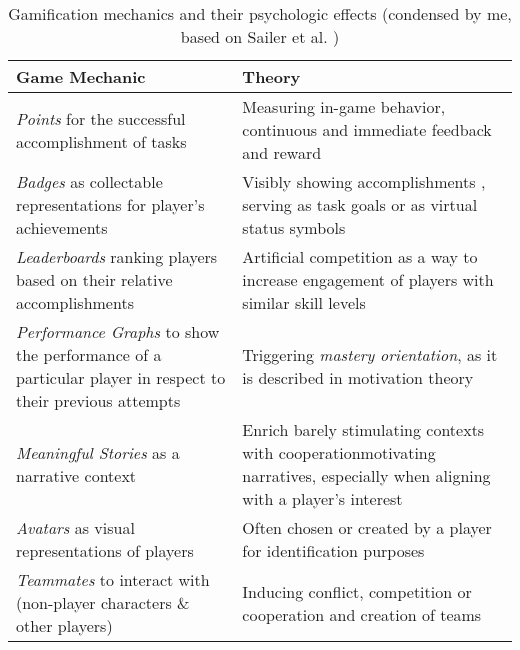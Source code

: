 \begin{table}[h]
  \begin{tabularx}{\textwidth}{| X | X |}
    \hline
    \textbf{Game Mechanic}                                                                                           & \textbf{Theory}                                                                                                                                        \\ \hline
    \textit{Points} for the successful accomplishment of tasks                                                       & Measuring in-game behavior, continuous and immediate feedback and reward \cite{sailer2014psychological}                                                \\ \hline
    \textit{Badges} as collectable representations for player's achievements                                         & Visibly showing accomplishments \cite{antin2011badges}, serving as task goals or as virtual status symbols \cite{werbach2012win}                       \\ \hline
    \textit{Leaderboards} ranking players based on their relative accomplishments                                    & Artificial competition as a way to increase engagement of players with similar skill levels \cite{landers2014empirical,werbach2012win}                 \\ \hline
    \textit{Performance Graphs} to show the performance of a particular player in respect to their previous attempts & Triggering \textit{mastery orientation}, as it is described in motivation theory \cite{dweck1986motivational,nicholls1984achievement}                  \\ \hline
    \textit{Meaningful Stories} as a narrative context                                                               & Enrich barely stimulating contexts with cooperationmotivating narratives, especially when aligning with a player's interest \cite{nicholson2015recipe} \\ \hline
    \textit{Avatars} as visual representations of players                                                            & Often chosen or created by a player for identification purposes \cite{werbach2012win}                                                                  \\ \hline
    \textit{Teammates} to interact with (non-player characters \& other players)                                     & Inducing conflict, competition or cooperation and creation of teams \cite{werbach2012win,kapp2012gamification}                                         \\ \hline
  \end{tabularx}
  \caption{\label{tab:gamification-mechanics}Gamification mechanics and their psychologic effects (condensed by me, based on Sailer et al. \cite[p. 373-374]{sailer2017gamification})}
\end{table}

